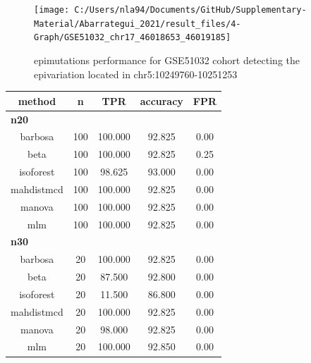 \documentclass[
]{article}
\begin{document}
\begin{figure}[H]

{\centering \texttt{[image: C:/Users/nla94/Documents/GitHub/Supplementary-Material/Abarrategui\_2021/result\_files/4-Graph/GSE51032\_chr17\_46018653\_46019185]} 

}

\caption{epimutations performance for GSE51032 cohort detecting the epivariation located in chr5:10249760-10251253}\label{fig:graph_GSE51032}
\end{figure}

\begin{table}
\centering
\begin{tabular}[t]{c|c|c|c|c}
\hline
method & n & TPR & accuracy & FPR\\
\hline
\multicolumn{5}{l}{\textbf{n20}}\\
\hline
\hspace{1em}barbosa & 100 & 100.000 & 92.825 & 0.00\\
\hline
\hspace{1em}beta & 100 & 100.000 & 92.825 & 0.25\\
\hline
\hspace{1em}isoforest & 100 & 98.625 & 93.000 & 0.00\\
\hline
\hspace{1em}mahdistmcd & 100 & 100.000 & 92.825 & 0.00\\
\hline
\hspace{1em}manova & 100 & 100.000 & 92.825 & 0.00\\
\hline
\hspace{1em}mlm & 100 & 100.000 & 92.825 & 0.00\\
\hline
\multicolumn{5}{l}{\textbf{n30}}\\
\hline
\hspace{1em}barbosa & 20 & 100.000 & 92.825 & 0.00\\
\hline
\hspace{1em}beta & 20 & 87.500 & 92.800 & 0.00\\
\hline
\hspace{1em}isoforest & 20 & 11.500 & 86.800 & 0.00\\
\hline
\hspace{1em}mahdistmcd & 20 & 100.000 & 92.825 & 0.00\\
\hline
\hspace{1em}manova & 20 & 98.000 & 92.825 & 0.00\\
\hline
\hspace{1em}mlm & 20 & 100.000 & 92.850 & 0.00\\

\end{tabular}
\end{table}
\end{document}
